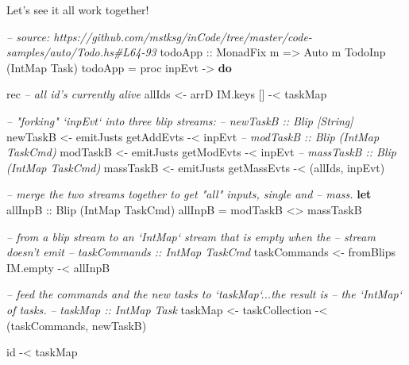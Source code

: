 \documentclass[]{article}
\newenvironment{Shaded}{}{}
\newcommand{\KeywordTok}[1]{\textcolor[rgb]{0.00,0.44,0.13}{\textbf{{#1}}}}
\newcommand{\DataTypeTok}[1]{\textcolor[rgb]{0.56,0.13,0.00}{{#1}}}
\newcommand{\CommentTok}[1]{\textcolor[rgb]{0.38,0.63,0.69}{\textit{{#1}}}}
\newcommand{\OtherTok}[1]{\textcolor[rgb]{0.00,0.44,0.13}{{#1}}}
\newcommand{\FunctionTok}[1]{\textcolor[rgb]{0.02,0.16,0.49}{{#1}}}
\newcommand{\NormalTok}[1]{{#1}}
\begin{document}
Let's see it all work together!

\begin{Shaded}
\begin{Highlighting}[]
\CommentTok{-- source: https://github.com/mstksg/inCode/tree/master/code-samples/auto/Todo.hs#L64-93}
\OtherTok{todoApp ::} \DataTypeTok{MonadFix} \NormalTok{m }\OtherTok{=>} \DataTypeTok{Auto} \NormalTok{m }\DataTypeTok{TodoInp} \NormalTok{(}\DataTypeTok{IntMap} \DataTypeTok{Task}\NormalTok{)}
\NormalTok{todoApp }\FunctionTok{=} \NormalTok{proc inpEvt }\OtherTok{->} \KeywordTok{do}

    \NormalTok{rec }\CommentTok{-- all id's currently alive}
        \NormalTok{allIds }\OtherTok{<-} \NormalTok{arrD IM.keys [] }\FunctionTok{-<} \NormalTok{taskMap}

        \CommentTok{-- "forking" `inpEvt` into three blip streams:}
        \CommentTok{-- newTaskB :: Blip [String]}
        \NormalTok{newTaskB  }\OtherTok{<-} \NormalTok{emitJusts getAddEvts  }\FunctionTok{-<} \NormalTok{inpEvt}
        \CommentTok{-- modTaskB :: Blip (IntMap TaskCmd)}
        \NormalTok{modTaskB  }\OtherTok{<-} \NormalTok{emitJusts getModEvts  }\FunctionTok{-<} \NormalTok{inpEvt}
        \CommentTok{-- massTaskB :: Blip (IntMap TaskCmd)}
        \NormalTok{massTaskB }\OtherTok{<-} \NormalTok{emitJusts getMassEvts }\FunctionTok{-<} \NormalTok{(allIds, inpEvt)}

        \CommentTok{-- merge the two streams together to get "all" inputs, single and}
        \CommentTok{-- mass.}
        \KeywordTok{let}\OtherTok{ allInpB ::} \DataTypeTok{Blip} \NormalTok{(}\DataTypeTok{IntMap} \DataTypeTok{TaskCmd}\NormalTok{)}
            \NormalTok{allInpB }\FunctionTok{=} \NormalTok{modTaskB }\FunctionTok{<>} \NormalTok{massTaskB}

        \CommentTok{-- from a blip stream to an `IntMap` stream that is empty when the}
        \CommentTok{-- stream doesn't emit}
        \CommentTok{-- taskCommands :: IntMap TaskCmd}
        \NormalTok{taskCommands }\OtherTok{<-} \NormalTok{fromBlips IM.empty }\FunctionTok{-<} \NormalTok{allInpB}

        \CommentTok{-- feed the commands and the new tasks to `taskMap`...the result is}
        \CommentTok{-- the `IntMap` of tasks.}
        \CommentTok{-- taskMap :: IntMap Task}
        \NormalTok{taskMap }\OtherTok{<-} \NormalTok{taskCollection }\FunctionTok{-<} \NormalTok{(taskCommands, newTaskB)}

    \NormalTok{id }\FunctionTok{-<} \NormalTok{taskMap}
\end{Highlighting}
\end{Shaded}
\end{document}
